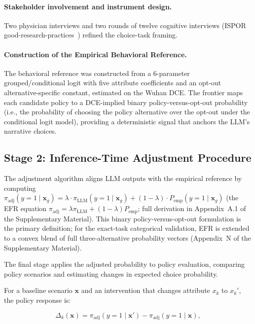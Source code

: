 \documentclass[12pt]{article}
\begin{document}
\paragraph{Stakeholder involvement and instrument design.}

Two physician interviews and two rounds of twelve cognitive interviews (ISPOR good-research-practices~\citep{Johnson2013DCE,Bridges2013DCE}) refined the choice-task framing.

\paragraph{Construction of the Empirical Behavioral Reference.}

The behavioral reference was constructed from a 6-parameter grouped/conditional logit with five attribute coefficients and an opt-out alternative-specific constant, estimated on the Wuhan DCE. The frontier maps each candidate policy to a DCE-implied binary policy-versus-opt-out probability (i.e., the probability of choosing the policy alternative over the opt-out under the conditional logit model), providing a deterministic signal that anchors the LLM's narrative choices.

\subsection{Stage 2: Inference-Time Adjustment Procedure} The adjustment algorithm aligns LLM outputs with the empirical reference by computing $\pi_{\mathrm{adj}}(y=1\mid\mathbf{x}_g) = \lambda \cdot \pi_{\mathrm{LLM}}(y=1\mid\mathbf{x}_g) + (1-\lambda) \cdot P_{\mathrm{emp}}(y=1\mid\mathbf{x}_g)$ (the EFR equation $\pi_{\mathrm{adj}} = \lambda \pi_{\mathrm{LLM}} + (1-\lambda) P_{\mathrm{emp}}$; full derivation in Appendix~A.1 of the Supplementary Material). This binary policy-versus-opt-out formulation is the primary definition; for the exact-task categorical validation, EFR is extended to a convex blend of full three-alternative probability vectors (Appendix~N of the Supplementary Material).
\label{sec:stage3}

The final stage applies the adjusted probability to policy evaluation, comparing policy scenarios and estimating changes in expected choice probability.

For a baseline scenario $\mathbf{x}$ and an intervention that changes attribute $x_k$ to $x_k'$, the policy response is:

\[
\Delta_k(\mathbf{x}) = \pi_{\mathrm{adj}}(y=1\mid\mathbf{x}') - \pi_{\mathrm{adj}}(y=1\mid\mathbf{x}),
\]
\end{document}

